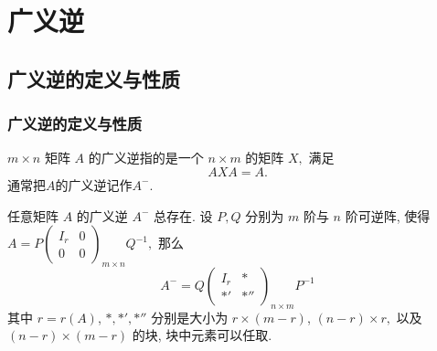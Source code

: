 
\section{广义逆}


\subsection{广义逆的定义与性质}


\begin{frame}
\frametitle{广义逆的定义与性质}

\begin{Def}
$m\times n$ 矩阵 $A$ 的广义逆指的是一个 $n\times m$ 的矩阵 $X,$ 满足
\[AXA = A.\]
通常把$A$的广义逆记作$A^-.$
\end{Def}

\pause

\begin{remark}[广义逆的普遍存在性]
任意矩阵 $A$ 的广义逆 $A^-$ 总存在. 设 $P,Q$ 分别为 $m$ 阶与 $n$ 阶可逆阵, 使得 $A = P \begin{pmatrix} I_r & 0 \\ 0 & 0 \end{pmatrix}_{m\times n}\!\!\!\!\!\!\!\!\!\!\! Q^{-1},$ 那么
\[A^- = Q \begin{pmatrix} I_r & * \\ *' & *'' \end{pmatrix}_{n\times m}\!\!\!\!\!\!\!\!\!\!\! P^{-1}\]
其中 $r = r(A)$, $*,*',*''$ 分别是大小为 $r \times (m-r)$, $(n-r) \times r,$ 以及 $(n-r) \times (m-r)$ 的块, 块中元素可以任取.
\end{remark}

\end{frame}


